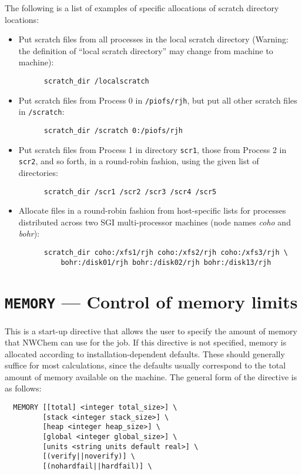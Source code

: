 The following is a list of examples of specific allocations of scratch
directory locations:
\begin{itemize}
\item Put scratch files from all processes in the local scratch directory 
(Warning: the definition of ``local scratch directory'' may change from 
machine to machine):
\begin{verbatim}
      scratch_dir /localscratch
\end{verbatim}
\item Put scratch files from Process 0 in \verb+/piofs/rjh+, but put all 
other scratch files in \verb+/scratch+:
\begin{verbatim}
      scratch_dir /scratch 0:/piofs/rjh
\end{verbatim}
\item Put scratch files from Process 1 in directory \verb+scr1+, those from
Process 2 in \verb+scr2+, and so forth, in a round-robin fashion, using the
given list of directories:
\begin{verbatim}
      scratch_dir /scr1 /scr2 /scr3 /scr4 /scr5
\end{verbatim}
\item Allocate files in a round-robin fashion from
  host-specific lists for processes distributed across two
 SGI multi-processor machines (node names {\em coho} and {\em bohr}):
\begin{verbatim}
      scratch_dir coho:/xfs1/rjh coho:/xfs2/rjh coho:/xfs3/rjh \
          bohr:/disk01/rjh bohr:/disk02/rjh bohr:/disk13/rjh
\end{verbatim}
\end{itemize}

\section{{\tt MEMORY} --- Control of memory limits}

This is a start-up directive that allows the user to specify the
amount of memory that NWChem can use for the job.  If this directive
is not specified, memory is allocated according to installation-dependent
defaults.  These should generally suffice for most
calculations, since the defaults usually correspond to the total amount
of memory available on the machine.  The general form of the directive
is as follows:

\begin{verbatim}
  MEMORY [[total] <integer total_size>] \
         [stack <integer stack_size>] \
         [heap <integer heap_size>] \
         [global <integer global_size>] \
         [units <string units default real>] \
         [(verify||noverify)] \
         [(nohardfail||hardfail)] \
\end{verbatim}

